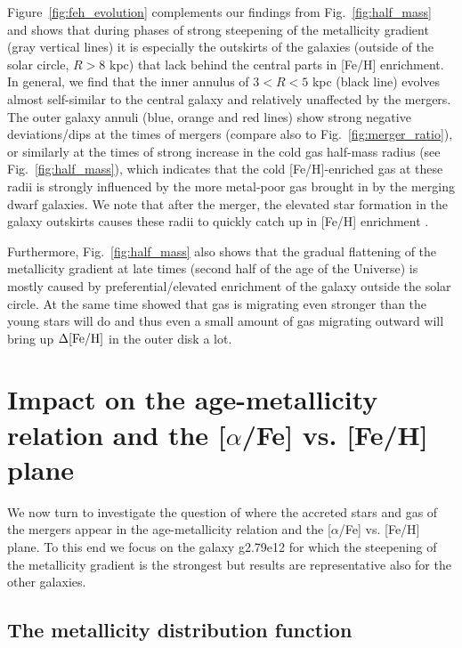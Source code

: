 \documentclass[useAMS,usenatbib]{mnras}
\begin{document}
Figure~\ref{fig:feh_evolution} complements our findings from Fig.~\ref{fig:half_mass} and shows that during phases of strong steepening of the metallicity gradient (gray vertical lines) it is especially the outskirts of the galaxies (outside of the solar circle, $R>8$ kpc) that lack behind the central parts in [Fe/H] enrichment. In general, we find that the inner annulus of $3<R<5$ kpc (black line) evolves almost self-similar to the central galaxy and relatively unaffected by the mergers. The outer galaxy annuli (blue, orange and red lines) show strong negative deviations/dips at the times of mergers (compare also to Fig.~\ref{fig:merger_ratio}), or similarly at the times of strong increase in the cold gas half-mass radius (see Fig.~\ref{fig:half_mass}), which indicates that the cold [Fe/H]-enriched gas at these radii is strongly influenced by the more metal-poor gas brought in by the merging dwarf galaxies. We note that after the merger, the elevated star formation in the galaxy outskirts causes these radii to quickly catch up in [Fe/H] enrichment \citep[see also Fig. 7 in][]{Buck2020}.

Furthermore, Fig.~\ref{fig:half_mass} also shows that the gradual flattening of the metallicity gradient at late times (second half of the age of the Universe) is mostly caused by preferential/elevated enrichment of the galaxy outside the solar circle. At the same time \cite{Minchev2012a} showed that gas is migrating even stronger than the young stars will do and thus even a small amount of gas migrating outward will bring up $\Delta\rm{[Fe/H]}$ in the outer disk a lot.


\section{Impact on the age-metallicity relation and the [$\alpha$/Fe] vs. [Fe/H] plane} \label{sec:results-age}

We now turn to investigate the question of where the accreted stars and gas of the mergers appear in the age-metallicity relation and the [$\alpha$/Fe] vs. [Fe/H] plane. To this end we focus on the galaxy g2.79e12 for which the steepening of the metallicity gradient is the strongest but results are representative also for the other galaxies.

\subsection{The metallicity distribution function}
\label{sec:mdf}
\end{document}
